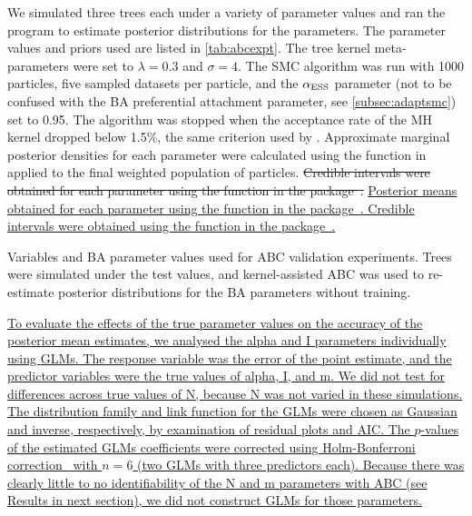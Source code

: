 We simulated three trees each under a variety of parameter values and ran the
 program to estimate posterior distributions for the
parameters. The parameter values and priors used are listed in
\cref{tab:abcexpt}. The tree kernel meta-parameters were set to $\lambda = 0.3$
and $\sigma = 4$. The \gls{SMC} algorithm was run with 1000 particles, five
sampled datasets per particle, and the $\alpha_{\operatorname{ESS}}$ parameter (not to be
confused with the \gls{BA} preferential attachment parameter, see
\cref{subsec:adaptsmc}) set to 0.95. The algorithm was stopped when the
acceptance rate of the \gls{MH} kernel dropped below 1.5\%, the same criterion
used by \citeauthor{del2012adaptive}. Approximate marginal posterior densities
for each parameter were calculated using the  function in
 applied to the final weighted population of particles.
{\color{red}\sout{Credible intervals were obtained for each parameter using the
 function in the 
package~\autocite{plummer2006coda}.}} {\color{blue}\uline{Posterior means
obtained for each parameter using the  function in the
 package~\autocite{harrell2016hmisc}. Credible intervals were
obtained using the  function in the 
package~\autocite{snow2013teachingdemos}.}}

\begin{table}[ht]
  \centering
  
  \caption[Variables used in grid search experiments]
  {
    Variables and \gls{BA} parameter values used for \gls{ABC} validation
    experiments. Trees were simulated under the test values, and
    kernel-assisted \gls{ABC} was used to re-estimate posterior distributions for the
    \gls{BA} parameters without training.
  }
  \label{tab:abcexpt}
\end{table}

{\color{blue}\uline{
To evaluate the effects of the true parameter values on the accuracy of the
posterior mean estimates, we analysed the \gls{alpha} and \gls{I} parameters
individually using \glspl{GLM}. The response variable was the error of the
point estimate, and the predictor variables were the true values of
\gls{alpha}, \gls{I}, and \gls{m}. We did not test for differences across true
values of \gls{N}, because \gls{N} was not varied in these simulations. The
distribution family and link function for the \glspl{GLM} were chosen as
Gaussian and inverse, respectively, by examination of residual plots and
\gls{AIC}. The $p$-values of the estimated \glspl{GLM} coefficients were
corrected using Holm-Bonferroni correction~\autocite{holm1979simple} with $n =
6$ (two \glspl{GLM} with three predictors each). Because there was clearly
little to no identifiability of the \gls{N} and \gls{m} parameters with
\gls{ABC} (see Results in next section), we did not construct \glspl{GLM} for
those parameters. }}

